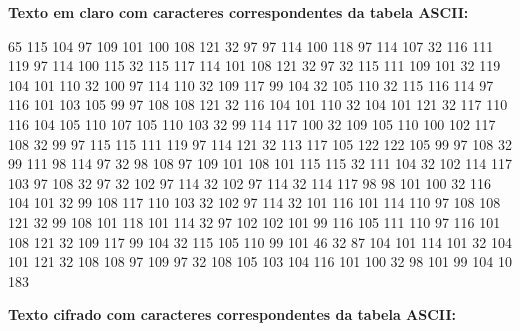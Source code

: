 \begin{apendicesenv}
\textbf{Texto em claro com caracteres correspondentes da tabela ASCII:}

65 115 104 97 109 101 100 108 121 32 97 97 114 100 118 97 114 107 32 116 111 119 97 114 100 115 32 115 117 114 101 108 121 32 97 32 115 111 109 101 32 119 104 101 110 32 100 97 114 110 32 109 117 99 104 32 105 110 32 115 116 114 97 116 101 103 105 99 97 108 108 121 32 116 104 101 110 32 104 101 121 32 117 110 116 104 105 110 107 105 110 103 32 99 114 117 100 32 109 105 110 100 102 117 108 32 99 97 115 115 111 119 97 114 121 32 113 117 105 122 122 105 99 97 108 32 99 111 98 114 97 32 98 108 97 109 101 108 101 115 115 32 111 104 32 102 114 117 103 97 108 32 97 32 102 97 114 32 102 97 114 32 114 117 98 98 101 100 32 116 104 101 32 99 108 117 110 103 32 102 97 114 32 101 116 101 114 110 97 108 108 121 32 99 108 101 118 101 114 32 97 102 102 101 99 116 105 111 110 97 116 101 108 121 32 109 117 99 104 32 115 105 110 99 101 46 32 87 104 101 114 101 32 104 101 121 32 108 108 97 109 97 32 108 105 103 104 116 101 100 32 98 101 99 104 10 183                                                                                                                                                                                                                                                                                                                                                                                                                                                                                                                                                                                                                                                                                                                                                                                                                                                           

\textbf{Texto cifrado com caracteres correspondentes da tabela ASCII:}


\end{apendicesenv}
